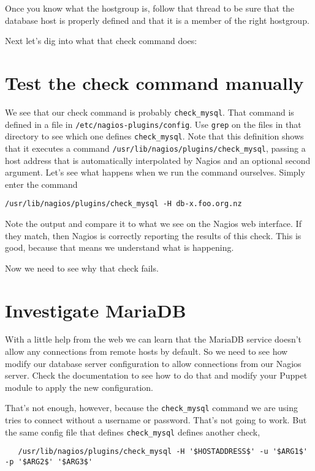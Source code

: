 \documentclass{article}         %
\begin{document}
Once you know what the hostgroup is, follow that thread to be sure that the database host is properly defined and that it is a member of the right hostgroup.

Next let's dig into what that check command does:

\section{Test the check command manually}
We see that our check command is probably \texttt{check\_mysql}. That command is defined in a file in \texttt{/etc/nagios-plugins/config}. Use \texttt{grep} on the files in that directory to see which one defines \texttt{check\_mysql}. Note that this definition shows that it executes a command \texttt{/usr/lib/nagios/plugins/check\_mysql}, passing a host address that is automatically interpolated by Nagios and an optional second argument. Let's see what happens when we run the command ourselves. Simply enter the command 

\texttt{/usr/lib/nagios/plugins/check\_mysql -H db-x.foo.org.nz}

Note the output and compare it to what we see on the Nagios web interface. If they match, then Nagios is correctly reporting the results of this check. This is good, because that means we understand what is happening.

Now we need to see why that check fails.

\section{Investigate MariaDB}
With a little help from the web we can learn that the MariaDB service doesn't allow any connections from remote hosts by default. So we need to see how modify our database server configuration to allow connections from our Nagios server. Check the documentation to see how to do that and modify your Puppet module to apply the new configuration.

That's not enough, however, because the \texttt{check\_mysql} command we are using tries to connect without a username or password. That's not going to work. But the same config file that defines \texttt{check\_mysql} defines another check, 

\begin{verbatim}
   /usr/lib/nagios/plugins/check_mysql -H '$HOSTADDRESS$' -u '$ARG1$' -p '$ARG2$' '$ARG3$'
\end{verbatim}
\end{document}
